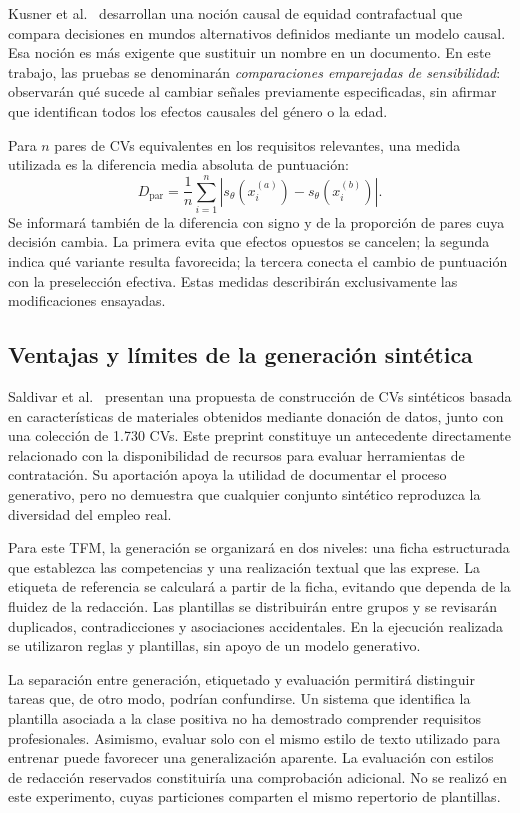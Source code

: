 \documentclass[11pt,a4paper,oneside]{report}
\begin{document}
Kusner et al.\ \cite{kusner2017} desarrollan una noción causal de equidad contrafactual que compara decisiones en mundos alternativos definidos mediante un modelo causal. Esa noción es más exigente que sustituir un nombre en un documento. En este trabajo, las pruebas se denominarán \textit{comparaciones emparejadas de sensibilidad}: observarán qué sucede al cambiar señales previamente especificadas, sin afirmar que identifican todos los efectos causales del género o la edad.

Para $n$ pares de CVs equivalentes en los requisitos relevantes, una medida utilizada es la diferencia media absoluta de puntuación:
\begin{equation}
D_{\mathrm{par}}=\frac{1}{n}\sum_{i=1}^{n}\left|s_{\theta}(x_i^{(a)})-s_{\theta}(x_i^{(b)})\right|.
\end{equation}
Se informará también de la diferencia con signo y de la proporción de pares cuya decisión cambia. La primera evita que efectos opuestos se cancelen; la segunda indica qué variante resulta favorecida; la tercera conecta el cambio de puntuación con la preselección efectiva. Estas medidas describirán exclusivamente las modificaciones ensayadas.

\subsection{Ventajas y límites de la generación sintética}

Saldivar et al.\ \cite{saldivar2025} presentan una propuesta de construcción de CVs sintéticos basada en características de materiales obtenidos mediante donación de datos, junto con una colección de 1.730 CVs. Este preprint constituye un antecedente directamente relacionado con la disponibilidad de recursos para evaluar herramientas de contratación. Su aportación apoya la utilidad de documentar el proceso generativo, pero no demuestra que cualquier conjunto sintético reproduzca la diversidad del empleo real.

Para este TFM, la generación se organizará en dos niveles: una ficha estructurada que establezca las competencias y una realización textual que las exprese. La etiqueta de referencia se calculará a partir de la ficha, evitando que dependa de la fluidez de la redacción. Las plantillas se distribuirán entre grupos y se revisarán duplicados, contradicciones y asociaciones accidentales. En la ejecución realizada se utilizaron reglas y plantillas, sin apoyo de un modelo generativo.

La separación entre generación, etiquetado y evaluación permitirá distinguir tareas que, de otro modo, podrían confundirse. Un sistema que identifica la plantilla asociada a la clase positiva no ha demostrado comprender requisitos profesionales. Asimismo, evaluar solo con el mismo estilo de texto utilizado para entrenar puede favorecer una generalización aparente. La evaluación con estilos de redacción reservados constituiría una comprobación adicional. No se realizó en este experimento, cuyas particiones comparten el mismo repertorio de plantillas.
\end{document}

